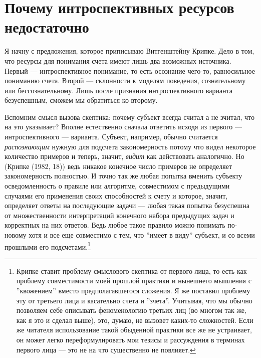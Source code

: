 \documentclass[12pt]{book}
\begin{document}
\section{Почему интроспективных ресурсов недостаточно}

Я начну с предложения, которое приписываю Витгенштейну Крипке. Дело в том, что ресурсы для понимания счета имеют лишь два возможных источника. Первый --- интроспективное понимание, то есть осознание чего-то, равносильное пониманию счета. Второй --- склонности к моделям поведения, сознательному или бессознательному. Лишь после признания интроспективного варианта безуспешным, сможем мы обратиться ко второму.

Вспомним смысл вызова скептика: почему субъект всегда считал а не зчитал, что на это указывает? Вполне естественно сначала ответить исходя из первого --- интроспективного --- варианта. Субъект, например, обычно считается \textit{распознающим} нужную для подсчета закономерность потому что видел некоторое количество примеров и теперь, значит, \textit{видит} как действовать аналогично. Но (Крипке (1982, 18)) ведь никакое конечное число примеров не определяет закономерность полностью. И точно так же любая попытка вменить субъекту осведомленность о правиле или алгоритме, совместимом с предыдущими случаями его применения своих способностей к счету и которое, значит, определяет ответы на последующие задачи --- любая такая попытка безуспешна от множественности интерпретаций конечного набора предыдущих задач и корректных на них ответов. Ведь любое такое правило можно понимать по-новому хотя и все еще совместимо с тем, что ''имеет в виду'' субъект, и со всеми прошлыми его подсчетами.\footnote{Крипке ставит проблему смыслового скептика от первого лица, то есть как проблему совместимости моей прошлой практики и нынешнего мышления с ''квожением'' вместо предполагавшегося сложения. Я же поставил проблему эту от третьего лица и касательно счета и ''зчета''. Учитывая, что мы обычно позволяем себе описывать феноменологию третьих лиц (во многом так же, как я это и сделал выше), это, думаю, не вызовет каких-то сложностей. Если же читателя использование такой обыденной практики все же не устраивает, он может легко переформулировать мои тезисы и рассуждения в терминах первого лица --- это не на что существенно не повлияет.}
\end{document}
